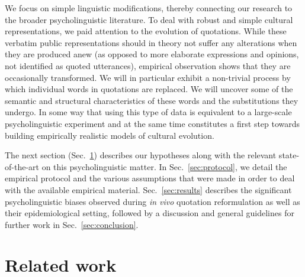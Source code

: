 We focus on simple linguistic modifications, thereby connecting our research to the broader psycholinguistic literature.
To deal with robust and simple cultural representations, we paid attention to the evolution of quotations.
While these verbatim public representations should in theory not suffer any alterations when they are produced anew (as opposed to more elaborate expressions and opinions, not identified as quoted utterances), empirical observation shows that they are occasionally transformed.
We will in particular exhibit a non-trivial process by which individual words in quotations are replaced.
We will uncover some of the semantic and structural characteristics of these words and the substitutions they undergo.
In some way that using this type of data is equivalent to a large-scale psycholinguistic experiment and at the same time constitutes a first step towards building empirically realistic models of cultural evolution.

The next section (Sec.~\ref{sec:related}) describes our hypotheses along with the relevant state-of-the-art on this psycholinguistic matter.
In Sec.~\ref{sec:protocol}, we detail the empirical protocol and the various assumptions that were made in order to deal with the available empirical material.
Sec.~\ref{sec:results} describes the significant psycholinguistic biases observed during \emph{in vivo} quotation reformulation as well as their epidemiological setting, followed by a discussion and general guidelines for further work in Sec.~\ref{sec:conclusion}.

\section{Related work} %
\label{sec:related}

 
